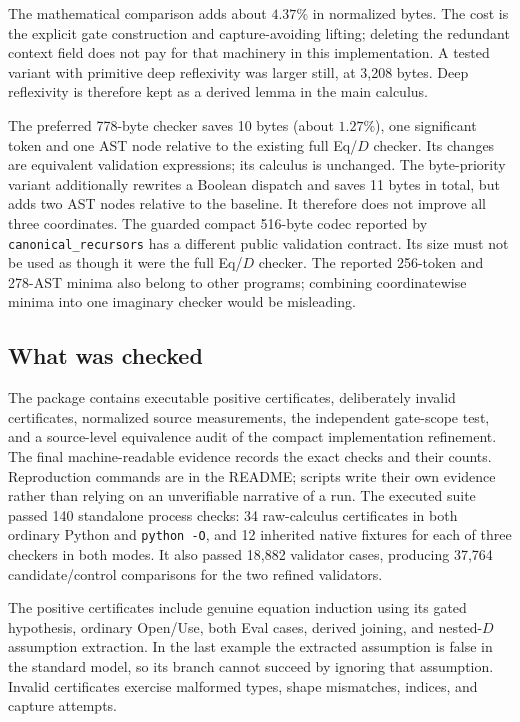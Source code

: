 \documentclass[11pt]{article}
\theoremstyle{definition}
\theoremstyle{remark}
\begin{document}
The mathematical comparison adds about $4.37\%$ in normalized bytes.
The cost is the explicit gate construction and capture-avoiding lifting;
deleting the redundant context field does not pay for that machinery in
this implementation. A tested variant with primitive deep reflexivity
was larger still, at 3,208 bytes. Deep reflexivity is therefore kept as
a derived lemma in the main calculus.

The preferred 778-byte checker saves 10 bytes (about $1.27\%$), one
significant token and one AST node relative to the existing full Eq/$D$
checker. Its changes are equivalent validation expressions; its calculus
is unchanged. The byte-priority variant additionally rewrites a Boolean
dispatch and saves 11 bytes in total, but adds two AST nodes relative to
the baseline. It therefore does not improve all three coordinates.
The guarded compact 516-byte
codec reported by \texttt{canonical\_recursors} has a different public
validation contract. Its size must not be used as though it were the
full Eq/$D$ checker. The reported 256-token and 278-AST minima also
belong to other programs; combining coordinatewise minima into one
imaginary checker would be misleading.

\subsection{What was checked}

The package contains executable positive certificates, deliberately
invalid certificates, normalized source measurements, the independent
gate-scope test, and a source-level equivalence audit of the compact
implementation refinement. The final machine-readable evidence records
the exact checks and their counts. Reproduction commands are in the
README; scripts write their own evidence rather than relying on an
unverifiable narrative of a run. The executed suite passed 140 standalone
process checks: 34 raw-calculus certificates in both ordinary Python and
\texttt{python -O}, and 12 inherited native fixtures for each of three
checkers in both modes. It also passed 18,882 validator cases, producing
37,764 candidate/control comparisons for the two refined validators.

The positive certificates include genuine equation induction using its
gated hypothesis, ordinary Open/Use, both Eval cases, derived joining,
and nested-$D$ assumption extraction. In the last example the extracted
assumption is false in the standard model, so its branch cannot succeed
by ignoring that assumption. Invalid certificates exercise malformed
types, shape mismatches, indices, and capture attempts.
\end{document}
